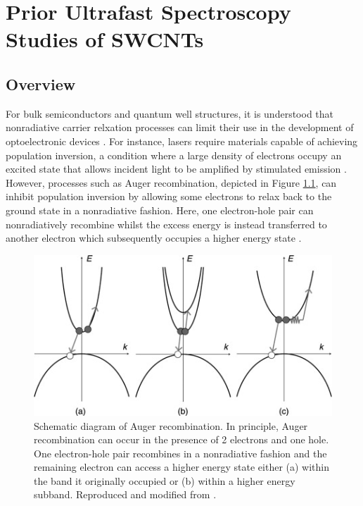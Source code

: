 \chapter{Prior Ultrafast Spectroscopy Studies of SWCNTs}

\section{Overview}

For bulk semiconductors and quantum well structures, it is understood that nonradiative carrier relxation processes can limit their use in the development of optoelectronic devices \cite{agrawal1986long, roulston1990bipolar, green1995silicon}. For instance, lasers require materials capable of achieving population inversion, a condition where a large density of electrons occupy an excited state that allows incident light to be amplified by stimulated emission \cite{agrawal1986long, siegman1986lasers}. However, processes such as Auger recombination, depicted in Figure \ref{fig:auger_recomb_meyaard}, can inhibit population inversion by allowing some electrons to relax back to the ground state in a nonradiative fashion. Here, one electron-hole pair can nonradiatively recombine whilst the excess energy is instead transferred to another electron which subsequently occupies a higher energy state \cite{beattie1959auger}.

\begin{figure}
	\centering
	\includegraphics[trim = 0 0 3.2cm 0, clip]{images/chapter_prior_works/auger_schematic_meyaard}
	\caption{Schematic diagram of Auger recombination. In principle, Auger recombination can occur in the presence of 2 electrons and one hole. One electron-hole pair recombines in a nonradiative fashion and the remaining electron can access a higher energy state either (a) within the band it originally occupied or (b) within a higher energy subband. Reproduced and modified from \cite{meyaard2014efficiency}. }
	\label{fig:auger_recomb_meyaard}
\end{figure}

